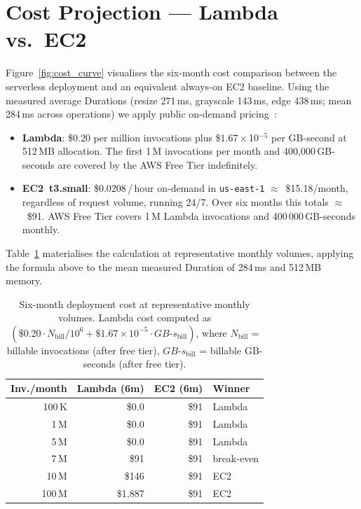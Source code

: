 \documentclass[10pt,twocolumn]{article}
\begin{document}
\section{Cost Projection --- Lambda vs.\ EC2}
\label{sec:cost}

Figure~\ref{fig:cost_curve} visualises the six-month cost comparison between
the serverless deployment and an equivalent always-on EC2 baseline. Using the
measured average Durations (resize 271\,ms, grayscale 143\,ms, edge 438\,ms;
mean 284\,ms across operations) we apply public on-demand
pricing~\cite{aws:lambda-pricing,aws:ec2-pricing}:

\begin{itemize}
  \item \textbf{Lambda}: \$0.20 per million invocations plus
        \$1.67\,$\times$\,10$^{-5}$ per GB-second at 512\,MB allocation.
        The first 1\,M invocations per month and 400{,}000\,GB-seconds are
        covered by the AWS Free Tier indefinitely.
  \item \textbf{EC2~t3.small}: \$0.0208\,/\,hour on-demand in
        \texttt{us-east-1} $\approx$~\$15.18/month, regardless of request volume,
        running 24/7. Over six months this totals $\approx$~\$91. AWS Free Tier
        covers 1\,M Lambda invocations and 400\,000\,GB-seconds monthly.
\end{itemize}

Table~\ref{tab:cost} materialises the calculation at representative monthly
volumes, applying the formula above to the mean measured Duration of 284\,ms
and 512\,MB memory.

\begin{table}[h]
\centering
\caption{Six-month deployment cost at representative monthly volumes.
Lambda cost computed as
$(\$0.20\cdot N_{\text{bill}}/10^6 + \$1.67\!\times\!10^{-5}\cdot GB{\text{-}}s_{\text{bill}})$,
where $N_{\text{bill}}$ = billable invocations (after free tier), $GB{\text{-}}s_{\text{bill}}$ = billable GB-seconds (after free tier).}
\label{tab:cost}
\small
\setlength{\tabcolsep}{4pt}
\begin{tabular}{r r r l}
\toprule
\textbf{Inv./month} & \textbf{Lambda (6m)} & \textbf{EC2 (6m)} & \textbf{Winner} \\
\midrule
   100\,K & \$0.0     & \$91 & Lambda \\
     1\,M & \$0.0     & \$91 & Lambda \\
     5\,M & \$0.0     & \$91 & Lambda \\
     7\,M & \$91      & \$91 & break-even \\
    10\,M & \$146     & \$91 & EC2 \\
   100\,M & \$1{,}887 & \$91 & EC2 \\
\bottomrule
\end{tabular}
\end{table}
\end{document}

